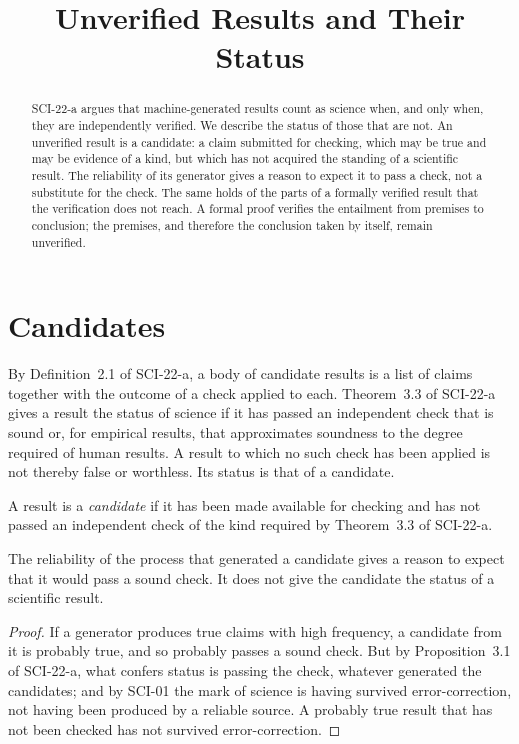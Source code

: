 \documentclass{situationist-preprint}
\title{Unverified Results and Their Status}
\begin{document}
\maketitle

\begin{abstract}
SCI-22-a argues that machine-generated results count as science when, and only when, they are independently verified. We describe the status of those that are not. An unverified result is a candidate: a claim submitted for checking, which may be true and may be evidence of a kind, but which has not acquired the standing of a scientific result. The reliability of its generator gives a reason to expect it to pass a check, not a substitute for the check. The same holds of the parts of a formally verified result that the verification does not reach. A formal proof verifies the entailment from premises to conclusion; the premises, and therefore the conclusion taken by itself, remain unverified.
\end{abstract}

\section{Candidates}

By Definition~2.1 of SCI-22-a, a body of candidate results is a list of claims together with the outcome of a check applied to each. Theorem~3.3 of SCI-22-a gives a result the status of science if it has passed an independent check that is sound or, for empirical results, that approximates soundness to the degree required of human results. A result to which no such check has been applied is not thereby false or worthless. Its status is that of a candidate.

\begin{definition}\label{d:candidate}
A result is a \emph{candidate} if it has been made available for checking and has not passed an independent check of the kind required by Theorem~3.3 of SCI-22-a.
\end{definition}

\begin{proposition}\label{p:reliability}
The reliability of the process that generated a candidate gives a reason to expect that it would pass a sound check. It does not give the candidate the status of a scientific result.
\end{proposition}

\begin{proof}
If a generator produces true claims with high frequency, a candidate from it is probably true, and so probably passes a sound check. But by Proposition~3.1 of SCI-22-a, what confers status is passing the check, whatever generated the candidates; and by SCI-01 the mark of science is having survived error-correction, not having been produced by a reliable source. A probably true result that has not been checked has not survived error-correction.
\end{proof}
\end{document}
